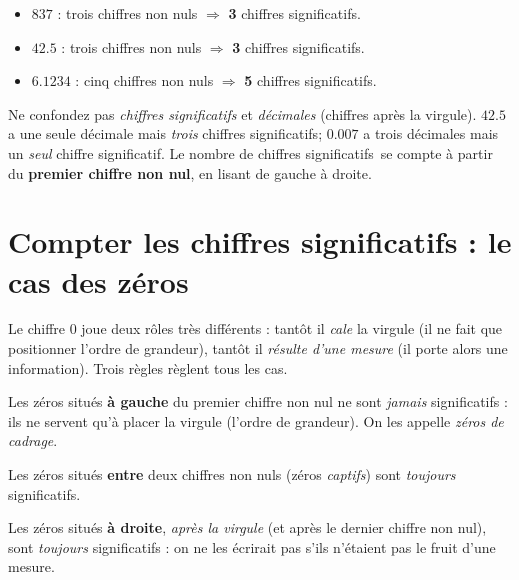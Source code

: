 \documentclass[11pt,a4paper]{article}
\newcommand{\cs}{chiffre significatif}
\newcommand{\CS}{chiffres significatifs}
\begin{document}
\begin{exemple}
\begin{itemize}[leftmargin=1.6em,topsep=2pt]
  \item $\num{837}$ : trois chiffres non nuls $\Rightarrow$ \textbf{3} \CS.
  \item $\num{42,5}$ : trois chiffres non nuls $\Rightarrow$ \textbf{3} \CS.
  \item $\num{6,1234}$ : cinq chiffres non nuls $\Rightarrow$ \textbf{5} \CS.
\end{itemize}
\end{exemple}

\begin{attention}
Ne confondez pas \emph{\CS} et \emph{décimales} (chiffres après la virgule). $\num{42,5}$ a une seule
décimale mais \emph{trois} \CS ; $\num{0,007}$ a trois décimales mais un \emph{seul} \cs. Le nombre de
\CS\ se compte à partir du \textbf{premier chiffre non nul}, en lisant de gauche à droite.
\end{attention}

\section{Compter les chiffres significatifs : le cas des zéros}
\label{sec:zeros}
Le chiffre $0$ joue deux rôles très différents : tantôt il \emph{cale} la virgule (il ne fait que
positionner l'ordre de grandeur), tantôt il \emph{résulte d'une mesure} (il porte alors une
information). Trois règles règlent tous les cas.

\begin{regle}
Les zéros situés \textbf{à gauche} du premier chiffre non nul ne sont \emph{jamais} significatifs :
ils ne servent qu'à placer la virgule (l'ordre de grandeur). On les appelle \emph{zéros de cadrage}.
\end{regle}

\begin{regle}
Les zéros situés \textbf{entre} deux chiffres non nuls (zéros \emph{captifs}) sont \emph{toujours}
significatifs.
\end{regle}

\begin{regle}
Les zéros situés \textbf{à droite}, \emph{après la virgule} (et après le dernier chiffre non nul),
sont \emph{toujours} significatifs : on ne les écrirait pas s'ils n'étaient pas le fruit d'une mesure.
\end{regle}
\end{document}
